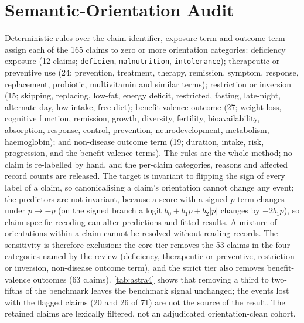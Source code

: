 \documentclass[11pt]{article}
\begin{document}
\section{Semantic-Orientation Audit}
\label{app:orientation}
Deterministic rules over the claim identifier, exposure term and outcome term assign each of the
165 claims to zero or more orientation categories: deficiency exposure (12 claims; \texttt{deficien},
\texttt{malnutrition}, \texttt{intolerance}); therapeutic or preventive use (24; prevention,
treatment, therapy, remission, symptom, response, replacement, probiotic, multivitamin and similar
terms); restriction or inversion (15; skipping, replacing, low-fat, energy deficit, restricted,
fasting, late-night, alternate-day, low intake, free diet); benefit-valence outcome (27; weight
loss, cognitive function, remission, growth, diversity, fertility, bioavailability, absorption,
response, control, prevention, neurodevelopment, metabolism, haemoglobin); and non-disease outcome
term (19; duration, intake, risk, progression, and the benefit-valence terms). The rules are the
whole method; no claim is re-labelled by hand, and the per-claim categories, reasons and affected
record counts are released. The target is invariant to flipping the sign of every label of a claim, so canonicalising a
claim's orientation cannot change any event; the predictors are not invariant, because a score
with a signed $p$ term changes under $p\to-p$ (on the signed branch a logit
$b_0+b_1 p+b_2|p|$ changes by $-2b_1 p$), so claim-specific recoding can alter
predictions and fitted results. A mixture of orientations within a claim cannot be resolved
without reading records. The sensitivity
is therefore exclusion: the core tier removes the 53 claims in the four categories named by the
review (deficiency, therapeutic or preventive, restriction or inversion, non-disease outcome term),
and the strict tier also removes benefit-valence outcomes (63 claims). \cref{tab:astra4} shows
that removing a third to two-fifths of the benchmark leaves the benchmark signal unchanged; the events lost with the flagged claims (20 and 26 of 71) are not the source of the
result. The retained claims are lexically filtered, not an adjudicated orientation-clean cohort.
\end{document}
